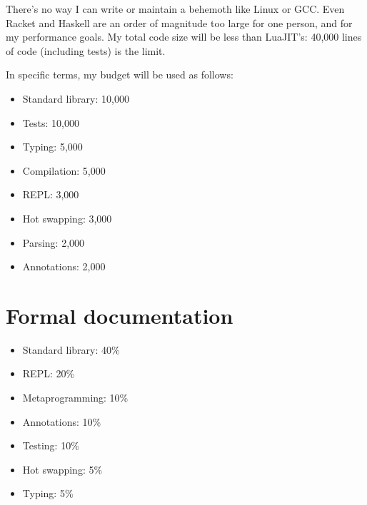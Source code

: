 There's no way I can write or maintain a behemoth like Linux or GCC.
Even Racket and Haskell are an order of magnitude too large for one
person, and for my performance goals. My total code size will be less
than LuaJIT's: 40,000 lines of code (including tests) is the limit.

In specific terms, my budget will be used as follows:

\begin{itemize}
\item Standard library:  10,000
\item Tests:             10,000
\item Typing:             5,000
\item Compilation:        5,000
\item REPL:               3,000
\item Hot swapping:       3,000
\item Parsing:            2,000
\item Annotations:        2,000
\end{itemize}


\section{Formal documentation}

\begin{itemize}
\item Standard library:  40\%
\item REPL:              20\%
\item Metaprogramming:   10\%
\item Annotations:       10\%
\item Testing:           10\%
\item Hot swapping:       5\%
\item Typing:             5\%
\end{itemize}

